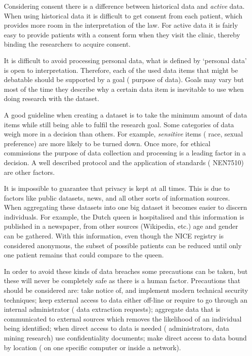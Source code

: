 Considering consent there is a difference between historical data and \emph{active} data.
When using historical data it is difficult to get consent from each patient, which provides more room in the interpretation of the law.
For active data it is fairly easy to provide patients with a consent form when they visit the clinic, thereby binding the researchers to acquire consent.

It is difficult to avoid processing personal data, \ie{} what is defined by `personal data' is open to interpretation.
Therefore, each of the used data items that might be debatable should be supported by a goal (\ie{} purpose of data).
Goals may vary but most of the time they describe why a certain data item is inevitable to use when doing research with the dataset.

A good guideline when creating a dataset is to take the minimum amount of data items while still being able to fulfil the research goal.
Some categories of data weigh more in a decision than others.
For example, \emph{sensitive} items (\eg{} race, sexual preference) are more likely to be turned down.
Once more, for ethical commissions the purpose of data collection and processing is a leading factor in a decision. 
A well described protocol and the application of standards (\eg{} NEN7510) are other factors.

It is impossible to guarantee that privacy is kept at all times.
This is due to factors like public datasets, news, and all other sorts of information sources.
When aggregating these datasets into one big dataset it becomes easier to discern individuals. 
For example, the Dutch queen is hospitalised and this information is published in a newspaper, from other sources (Wikipedia, etc.) age and gender can be gathered.
With this information, even though the NICE registry is considered anonymous, the subset of possible patients can be reduced until only one patient remains that could compare to the queen.

In order to avoid these kinds of data breaches some precautions can be taken, but these will never be completely safe as there is a human factor.
Precautions that should be considered are: take notice of, and implement modern technical security techniques; keep external access to data either off-line or require to go through an internal administrator (\eg{} data extraction requests); aggregate data that is communicated to external sources which removes the likelihood of an individual being identified; when direct access to data is needed (\eg{} administrators, data mining research) use confidentiality documents; make direct access to data bound by location (\eg{} on one specific computer or inside a network).

